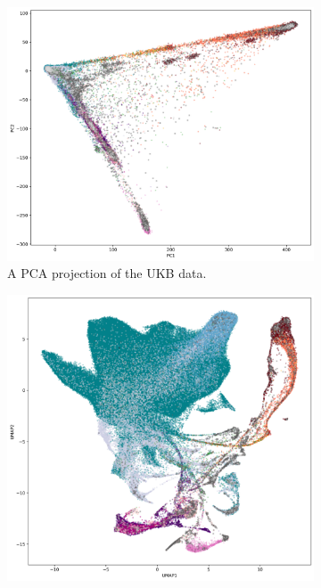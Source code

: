 \documentclass[12pt]{article}
\begin{document}
\clearpage

\begin{figure}[h!]
  \centering
  \begin{subfigure}[b]{0.49\linewidth}
    \includegraphics[width=\linewidth]{code/ukb/images/ukbb_pca_coords_eth.png}
    \caption{A PCA projection of the UKB data.}
    \label{fig:UKB_PCA}
  \end{subfigure}
  \begin{subfigure}[b]{0.49\linewidth}
    \includegraphics[width=\linewidth]{code/ukb/images/UKBB_UMAP_PC20_NC2_NN15_MD05_2018454111_eth.png}

\end{subfigure}
\end{figure}
\end{document}
